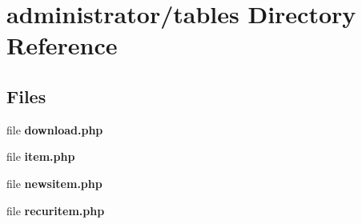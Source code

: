 \section{administrator/tables Directory Reference}
\label{dir_38af3bf6ab26697f96aafcc2ae17f5e6}
\subsection*{Files}
\begin{DoxyCompactItemize}
\item 
file \textbf{ download.\+php}
\item 
file \textbf{ item.\+php}
\item 
file \textbf{ newsitem.\+php}
\item 
file \textbf{ recuritem.\+php}
\end{DoxyCompactItemize}
